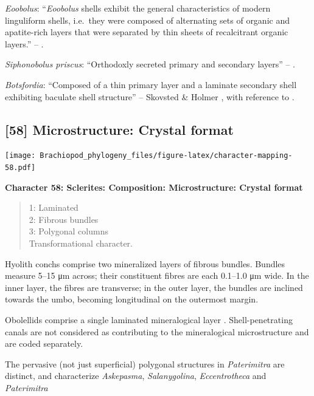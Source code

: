 \documentclass[]{book}
\theoremstyle{definition}
\theoremstyle{definition}
\theoremstyle{definition}
\theoremstyle{remark}
\begin{document}
\emph{Eoobolus}: ``\emph{Eoobolus} shells exhibit the general
characteristics of modern linguliform shells, i.e.~they were composed of
alternating sets of organic and apatite-rich layers that were separated
by thin sheets of recalcitrant organic layers.'' --
\citet{Balthasar2007Anearly}.

\emph{Siphonobolus priscus}: ``Orthodoxly secreted primary and secondary
layers'' -- \citet{Williams2004Chemicostructure}.

\emph{Botsfordia}: ``Composed of a thin primary layer and a laminate
secondary shell exhibiting baculate shell structure'' -- Skovsted \&
Holmer \citeyearpar{Skovsted2005EarlyCambrian}, with reference to
\citet{Skovsted2003EarlyCambrian}.

\hypertarget{microstructure-crystal-format}{%
\subsection*{{[}58{]} Microstructure: Crystal
format}\label{microstructure-crystal-format}}

\texttt{[image: Brachiopod\_phylogeny\_files/figure-latex/character-mapping-58.pdf]}

\textbf{Character 58: Sclerites: Composition: Microstructure: Crystal
format}

\begin{quote}
1: Laminated\\
2: Fibrous bundles\\
3: Polygonal columns\\
Transformational character.
\end{quote}

Hyolith conchs comprise two mineralized layers of fibrous bundles.
Bundles measure 5--15 μm across; their constituent fibres are each
0.1--1.0 μm wide. In the inner layer, the fibres are transverse; in the
outer layer, the bundles are inclined towards the umbo, becoming
longitudinal on the outermost margin.

Obolellids comprise a single laminated mineralogical layer
\citep{Balthasar2008iMummpikia}. Shell-penetrating canals are not
considered as contributing to the mineralogical microstructure and are
coded separately.

The pervasive (not just superficial) polygonal structures in
\emph{Paterimitra} are distinct, and characterize \emph{Askepasma},
\emph{Salanygolina}, \emph{Eccentrotheca} and \emph{Paterimitra}
\citep{Larsson2014iPaterimitra}
\end{document}

